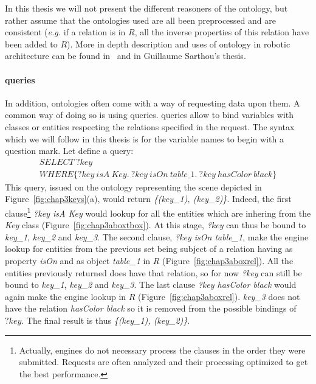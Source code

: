 \documentclass[a4paper,11pt,twoside]{StyleThese}
\begin{document}
In this thesis we will not present the different reasoners of the ontology, but rather assume that the ontologies used are all been preprocessed and are consistent (\textit{e.g.} if a relation is in $R$, all the inverse properties of this relation have been added to $R$). More in depth description and uses of ontology in robotic architecture can be found in~\cite{sarthou2019ontologenius} and in Guillaume Sarthou's thesis.

\paragraph{\sparql{} queries}
In addition, ontologies often come with a way of requesting data upon them. A common way of doing so is using \sparql{} queries. \sparql{} queries allow to bind variables with classes or entities respecting the relations specified in the request. The syntax which we will follow in this thesis is for the variable names to begin with a question mark. Let define a \sparql{} query: 
\begin{multline*}
SELECT \ ?key\\
WHERE \{?key \ isA \ Key. \ ?key \ isOn \ table\_1. \ ?key \ hasColor \ black\}
\end{multline*}
This query, issued on the ontology representing the scene depicted in Figure~\ref{fig:chap3keys}(a), would return \textit{\{(key\_1), (key\_2)\}}. Indeed, the first clause\footnote{Actually, \sparql{} engines do not necessary process the clauses in the order they were submitted. Requests are often analyzed and their processing optimized to get the best performance.} \textit{?key isA Key} would lookup for all the entities which are inhering from the \textit{Key} class (Figure~\ref{fig:chap3aboxtbox}). At this stage, \textit{?key} can thus be bound to \textit{key\_1}, \textit{key\_2} and \textit{key\_3}. The second clause, \textit{?key isOn table\_1}, make the \sparql{} engine lookup for entities from the previous set being subject of a relation having as property \textit{isOn} and as object \textit{table\_1} in $R$ (Figure~\ref{fig:chap3aboxrel}). All the entities previously returned does have that relation, so for now \textit{?key} can still be bound to \textit{key\_1}, \textit{key\_2} and \textit{key\_3}. The last clause \textit{?key hasColor black} would again make the engine lookup in $R$ (Figure~\ref{fig:chap3aboxrel}). \textit{key\_3} does not have the relation \textit{hasColor black} so it is removed from the possible bindings of $?key$. The final result is thus \textit{\{(key\_1), (key\_2)\}}. 
\end{document}
